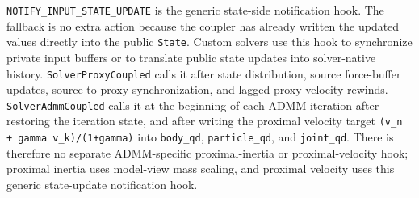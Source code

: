 \documentclass[11pt]{article}
\begin{document}
\texttt{NOTIFY\_INPUT\_STATE\_UPDATE} is the generic state-side notification
hook. The fallback is no extra action because the coupler has already written
the updated values directly into the public \texttt{State}. Custom solvers use
this hook to synchronize private input buffers or to translate public state
updates into solver-native history. \texttt{SolverProxyCoupled} calls it after
state distribution, source force-buffer updates, source-to-proxy synchronization,
and lagged proxy velocity rewinds. \texttt{SolverAdmmCoupled} calls it at the
beginning of each ADMM iteration after restoring the iteration state, and after
writing the proximal velocity target
\texttt{(v\_n + gamma v\_k)/(1+gamma)} into \texttt{body\_qd},
\texttt{particle\_qd}, and \texttt{joint\_qd}. There is therefore no separate
ADMM-specific proximal-inertia or proximal-velocity hook; proximal inertia uses
model-view mass scaling, and proximal velocity uses this generic state-update
notification hook.
\end{document}
